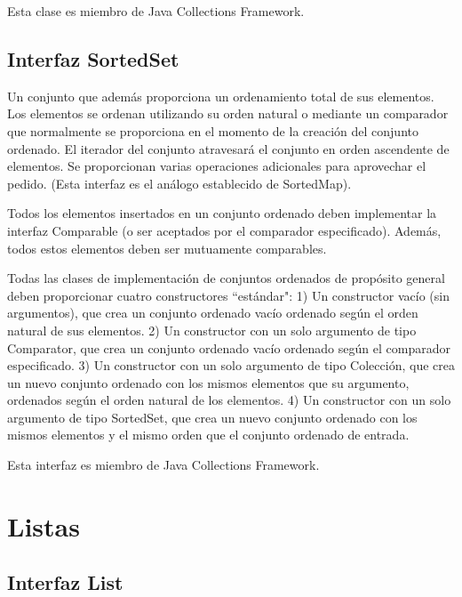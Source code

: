 \documentclass[11pt]{article}
\begin{document}
\par

Esta clase es miembro de Java Collections Framework.

\subsection{Interfaz SortedSet}
\par
Un conjunto que además proporciona un ordenamiento total de sus 
elementos. Los elementos se ordenan utilizando su orden natural o 
mediante un comparador que normalmente se proporciona en el momento 
de la creación del conjunto ordenado. El iterador del conjunto 
atravesará el conjunto en orden ascendente de elementos. Se 
proporcionan varias operaciones adicionales para aprovechar el 
pedido. (Esta interfaz es el análogo establecido de SortedMap).
\par

Todos los elementos insertados en un conjunto ordenado deben 
implementar la interfaz Comparable (o ser aceptados por el comparador 
especificado). Además, todos estos elementos deben ser mutuamente 
comparables.
\par

Todas las clases de implementación de conjuntos ordenados de 
propósito general deben proporcionar cuatro constructores ``estándar": 
1) Un constructor vacío (sin argumentos), que crea un conjunto 
ordenado vacío ordenado según el orden natural de sus elementos. 2) 
Un constructor con un solo argumento de tipo Comparator, que crea un 
conjunto ordenado vacío ordenado según el comparador especificado. 3) 
Un constructor con un solo argumento de tipo Colección, que crea un 
nuevo conjunto ordenado con los mismos elementos que su argumento, 
ordenados según el orden natural de los elementos. 4) Un constructor 
con un solo argumento de tipo SortedSet, que crea un nuevo conjunto 
ordenado con los mismos elementos y el mismo orden que el conjunto 
ordenado de entrada.
\par
Esta interfaz es miembro de Java Collections Framework.

\section{Listas}

\subsection{Interfaz List}
\par
\end{document}
